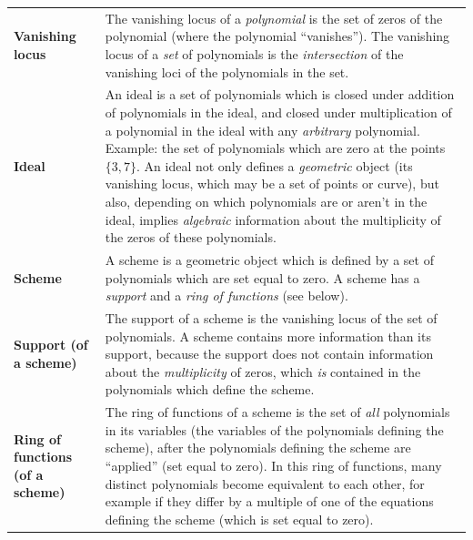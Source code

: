 \documentclass[12pt]{article}
\begin{document}
\begin{center}
    \begin{tabular}{p{0.2\linewidth} p{0.8\linewidth}}
        \raggedright\textbf{Vanishing locus} & The vanishing locus of a \emph{polynomial} is the set of zeros of the polynomial (where the polynomial ``vanishes''). The vanishing locus of a \emph{set} of polynomials is the \emph{intersection} of the vanishing loci of the polynomials in the set. \\[0.7em]
        \raggedright\textbf{Ideal} & An ideal is a set of polynomials which is closed under addition of polynomials in the ideal, and closed under multiplication of a polynomial in the ideal with any \emph{arbitrary} polynomial. Example: the set of polynomials which are zero at the points $\{3, 7\}$. An ideal not only defines a \emph{geometric} object (its vanishing locus, which may be a set of points or curve), but also, depending on which polynomials are or aren't in the ideal, implies \emph{algebraic} information about the multiplicity of the zeros of these polynomials. \\[0.7em]
        \raggedright\textbf{Scheme} & A scheme is a geometric object which is defined by a set of polynomials which are set equal to zero. A scheme has a \emph{support} and a \emph{ring of functions} (see below). \\[0.7em]
        \raggedright\textbf{Support (of a scheme)} & The support of a scheme is the vanishing locus of the set of polynomials. A scheme contains more information than its support, because the support does not contain information about the \emph{multiplicity} of zeros, which \emph{is} contained in the polynomials which define the scheme. \\[0.7em]
        \raggedright\textbf{Ring of functions (of a scheme)} & The ring of functions of a scheme is the set of \emph{all} polynomials in its variables (the variables of the polynomials defining the scheme), after the polynomials defining the scheme are ``applied'' (set equal to zero). In this ring of functions, many distinct polynomials become equivalent to each other, for example if they differ by a multiple of one of the equations defining the scheme (which is set equal to zero). \\[0.7em]
    \end{tabular}
\end{center}
\end{document}
